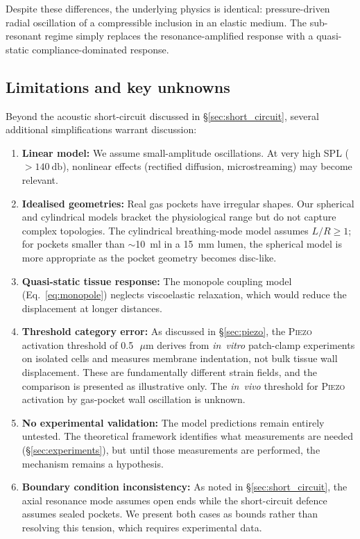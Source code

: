 \documentclass[12pt]{article}
\newcommand{\piezo}{\textsc{Piezo}}
\newcommand{\um}{\ensuremath{\,\mu\text{m}}}
\begin{document}
Despite these differences, the underlying physics is identical:
pressure-driven radial oscillation of a compressible inclusion in an
elastic medium.  The sub-resonant regime simply replaces the
resonance-amplified response with a quasi-static compliance-dominated
response.

\subsection{Limitations and key unknowns}
\label{sec:limitations}

Beyond the acoustic short-circuit discussed in \S\ref{sec:short_circuit},
several additional simplifications warrant discussion:
\begin{enumerate}
  \item \textbf{Linear model:} We assume small-amplitude oscillations.
        At very high SPL ($>\SI{140}{\decibel}$), nonlinear effects
        (rectified diffusion, microstreaming) may become relevant.
  \item \textbf{Idealised geometries:} Real gas pockets have irregular
        shapes.  Our spherical and cylindrical models bracket the
        physiological range but do not capture complex topologies.
        The cylindrical breathing-mode model assumes $L/R \geq 1$;
        for pockets smaller than $\sim$\SI{10}{\milli\litre} in a
        \SI{15}{\milli\metre} lumen, the spherical model is more
        appropriate as the pocket geometry becomes disc-like.
  \item \textbf{Quasi-static tissue response:} The monopole coupling
        model (Eq.~\ref{eq:monopole}) neglects viscoelastic relaxation,
        which would reduce the displacement at longer distances.
  \item \textbf{Threshold category error:} As discussed in
        \S\ref{sec:piezo}, the \piezo{} activation threshold of
        \SI{0.5}{\um} derives from \emph{in~vitro} patch-clamp experiments
        on isolated cells and measures membrane indentation, not bulk tissue
        wall displacement.  These are fundamentally different strain fields,
        and the comparison is presented as illustrative only.  The
        \emph{in~vivo} threshold for \piezo{} activation by gas-pocket
        wall oscillation is unknown.
  \item \textbf{No experimental validation:} The model predictions remain
        entirely untested.  The theoretical framework identifies what
        measurements are needed (\S\ref{sec:experiments}), but until those
        measurements are performed, the mechanism remains a hypothesis.
  \item \textbf{Boundary condition inconsistency:} As noted in
        \S\ref{sec:short_circuit}, the axial resonance mode assumes open
        ends while the short-circuit defence assumes sealed pockets.  We
        present both cases as bounds rather than resolving this tension,
        which requires experimental data.
\end{enumerate}
\end{document}

